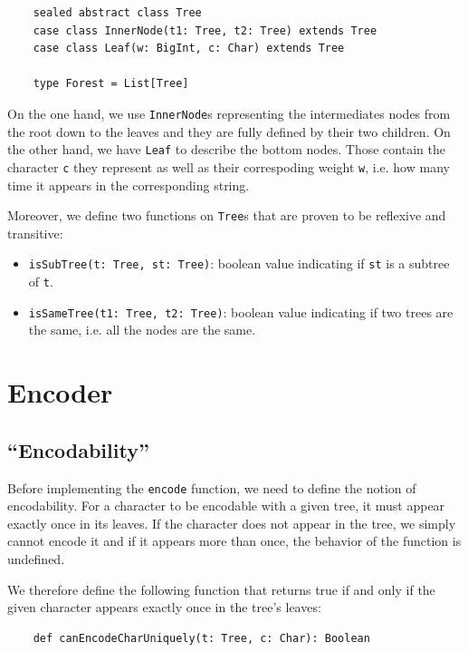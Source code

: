\documentclass[a4paper,UKenglish,cleveref, autoref, thm-restate]{lipics-v2021}
\begin{document}
\begin{lstlisting}
    sealed abstract class Tree
    case class InnerNode(t1: Tree, t2: Tree) extends Tree
    case class Leaf(w: BigInt, c: Char) extends Tree
  
    type Forest = List[Tree]
\end{lstlisting}

On the one hand, we use \lstinline{InnerNode}s representing the intermediates nodes from the root down to the leaves and they are fully defined by their two children. On the other hand, we have \lstinline{Leaf} to describe the bottom nodes. Those contain the character \lstinline{c} they represent as well as their correspoding weight \lstinline{w}, i.e. how many time it appears in the corresponding string.

Moreover, we define two functions on \lstinline{Tree}s that are proven to be reflexive and transitive:
\begin{itemize}
    \item \lstinline{isSubTree(t: Tree, st: Tree)}: boolean value indicating if \lstinline{st} is a subtree of \lstinline{t}.
    \item \lstinline{isSameTree(t1: Tree, t2: Tree)}: boolean value indicating if two trees are the same, i.e. all the nodes are the same.
\end{itemize}

\section{Encoder}

\subsection{``Encodability''}
Before implementing the \lstinline{encode} function, we need to define the notion of encodability. For a character to be encodable with a given tree, it must appear exactly once in its leaves.
If the character does not appear in the tree, we simply cannot encode it and if it appears more than once, the behavior of the function is undefined.

We therefore define the following function that returns true if and only if the given character appears exactly once in the tree's leaves:

\begin{lstlisting}
    def canEncodeCharUniquely(t: Tree, c: Char): Boolean
\end{lstlisting}
\end{document}

